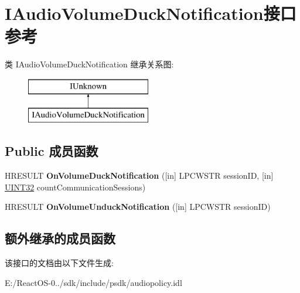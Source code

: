 \hypertarget{interface_i_audio_volume_duck_notification}{}\section{I\+Audio\+Volume\+Duck\+Notification接口 参考}
\label{interface_i_audio_volume_duck_notification}
类 I\+Audio\+Volume\+Duck\+Notification 继承关系图\+:\begin{figure}[H]
\begin{center}
\leavevmode
\includegraphics[height=2.000000cm]{interface_i_audio_volume_duck_notification}
\end{center}
\end{figure}
\subsection*{Public 成员函数}
\begin{DoxyCompactItemize}
\item 
\mbox{\label{interface_i_audio_volume_duck_notification_a6dfc9511622411044d50124d2eb61a76}} 
H\+R\+E\+S\+U\+LT {\bfseries On\+Volume\+Duck\+Notification} (\mbox{[}in\mbox{]} L\+P\+C\+W\+S\+TR session\+ID, \mbox{[}in\mbox{]} \hyperlink{_processor_bind_8h_ae1e6edbbc26d6fbc71a90190d0266018}{U\+I\+N\+T32} count\+Communication\+Sessions)
\item 
\mbox{\label{interface_i_audio_volume_duck_notification_a2649aab57329debe41aac9524ef2f996}} 
H\+R\+E\+S\+U\+LT {\bfseries On\+Volume\+Unduck\+Notification} (\mbox{[}in\mbox{]} L\+P\+C\+W\+S\+TR session\+ID)
\end{DoxyCompactItemize}
\subsection*{额外继承的成员函数}


该接口的文档由以下文件生成\+:\begin{DoxyCompactItemize}
\item 
E\+:/\+React\+O\+S-\/0../sdk/include/psdk/audiopolicy.\+idl\end{DoxyCompactItemize}
